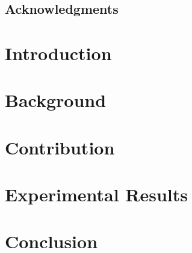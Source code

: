 \documentclass[12pt,twoside]{report}
\begin{document}
\clearpage{\pagestyle{empty}\cleardoublepage}
\setcounter{page}{1}
\pagestyle{fancy}

\begin{abstract}



\end{abstract}

\cleardoublepage
\section*{Acknowledgments}

\clearpage{\pagestyle{empty}\cleardoublepage}

\tableofcontents


\clearpage{\pagestyle{empty}\cleardoublepage}
\setcounter{page}{1}
\fancyhead[LE,RO]{\slshape \rightmark}
\fancyhead[LO,RE]{\slshape \leftmark}


\chapter{Introduction}



\chapter{Background}



\chapter{Contribution}


\chapter{Experimental Results}


\chapter{Conclusion}




\end{document}
